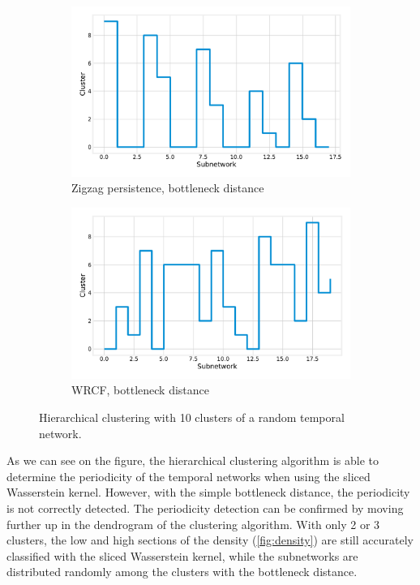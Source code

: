 \documentclass[a4paper,11pt,openany,extrafontsizes]{memoir}
\begin{document}
\begin{figure}[ht]
  \begin{subfigure}[b]{0.46\linewidth}
    \centering
    \includegraphics[width=\linewidth]{fig/gen_zz_b.pdf}
    \caption{Zigzag persistence, bottleneck distance}%
    \label{fig:gen_zz_b}
  \end{subfigure}\qquad
  \begin{subfigure}[b]{0.46\linewidth}
    \centering
    \includegraphics[width=\linewidth]{fig/gen_wrcf_b.pdf}
    \caption{WRCF, bottleneck distance}%
    \label{fig:gen_wrcf_b}
  \end{subfigure}
  \caption{Hierarchical clustering with 10 clusters of a random
    temporal network.}%
  \label{fig:gen}
\end{figure}

As we can see on the figure, the hierarchical clustering algorithm is
able to determine the periodicity of the temporal networks when using
the sliced Wasserstein kernel. However, with the simple bottleneck
distance, the periodicity is not correctly detected. The periodicity
detection can be confirmed by moving further up in the dendrogram of
the clustering algorithm. With only 2 or 3 clusters, the low and high
sections of the density (\autoref{fig:density}) are still accurately
classified with the sliced Wasserstein kernel, while the subnetworks
are distributed randomly among the clusters with the bottleneck
distance.
\end{document}
